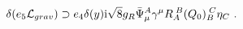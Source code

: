 \begin{equation}  
\delta  (e_5{\cal L}_{grav}) \supset e_4\delta(y){\rm i}\sqrt{8}g_R \bar{\Psi}_\mu^A\gamma^\mu R_{A}^{\;B} (Q_0)_{B}^{\;C}\eta_C \ .
   \end{equation} 
